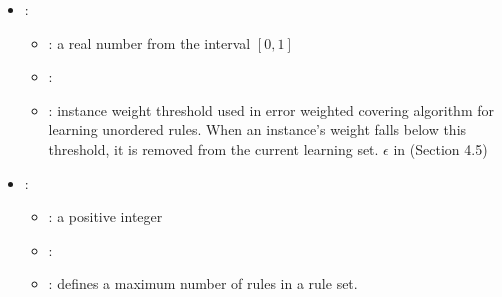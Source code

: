 \begin{itemize}
\begin{itemize}
           \end{itemize}
    \item {}:
           \begin{itemize}
                \item \optionPossibleValues{}:  a real number from the interval $[0, 1]$
                \item \optionDefaultValue{}: 
                \item \optionDescrption{}: instance weight threshold used in error weighted covering algorithm for learning unordered rules. When an instance's weight falls below this threshold, it is removed from the current learning set.  $\epsilon$ in \cite{Zenko07} (Section 4.5)
           \end{itemize}
    \item {}:
           \begin{itemize}
                \item \optionPossibleValues{}: a positive integer
                \item \optionDefaultValue{}: 
                \item \optionDescrption{}:  defines a maximum number of rules in a rule set.
           \end{itemize}
\end{itemize}
